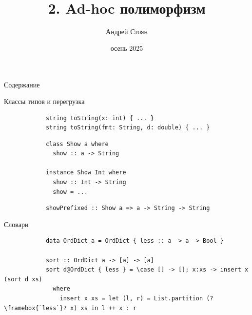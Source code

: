 
\newif\ifhandout




\title[3. Ad-hoc полиморфизм]{2. Ad-hoc полиморфизм}
\author{Андрей Стоян}

\date{осень 2025}



    \mymaketitle

    \begin{frame}[noframenumbering]{Содержание}
        \tableofcontents
    \end{frame}

    \begin{frame}[fragile]{Классы типов и перегрузка}
        \pause
        \begin{verbatim}
            string toString(x: int) { ... }
            string toString(fmt: String, d: double) { ... }
        \end{verbatim}
        \pause\vspace{1em}
        \begin{verbatim}
            class Show a where
              show :: a -> String

            instance Show Int where
              show :: Int -> String
              show = ...
        \end{verbatim}
        \pause\vspace{1em}
        \begin{verbatim}
            showPrefixed :: Show a => a -> String -> String
        \end{verbatim}
    \end{frame}


    \begin{frame}[fragile]{Словари}
        \pause
        \begin{verbatim}
            data OrdDict a = OrdDict { less :: a -> a -> Bool }

            sort :: OrdDict a -> [a] -> [a]
            sort d@OrdDict { less } = \case [] -> []; x:xs -> insert x (sort d xs)
              where
                insert x xs = let (l, r) = List.partition (?\framebox{`less`}? x) xs in l ++ x : r
        \end{verbatim}
    \end{frame}

